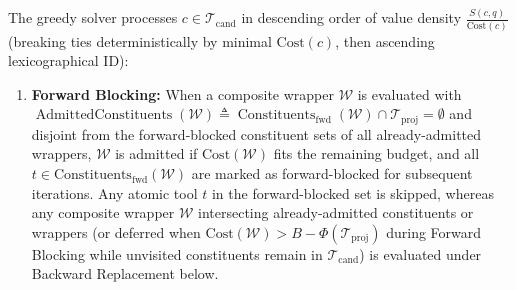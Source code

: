 \documentclass[conference,10pt]{IEEEtran}
\begin{document}
The greedy solver processes $c \in \mathcal{T}_{\text{cand}}$ in descending order of value density $\frac{S(c, q)}{\text{Cost}(c)}$ (breaking ties deterministically by minimal $\text{Cost}(c)$, then ascending lexicographical ID):
\begin{enumerate}
    \item \textbf{Forward Blocking:} When a composite wrapper $\mathcal{W}$ is evaluated with $\operatorname{AdmittedConstituents}(\mathcal{W}) \triangleq \operatorname{Constituents}_{\text{fwd}}(\mathcal{W}) \cap \mathcal{T}_{\text{proj}} = \emptyset$ and disjoint from the forward-blocked constituent sets of all already-admitted wrappers, $\mathcal{W}$ is admitted if $\text{Cost}(\mathcal{W})$ fits the remaining budget, and all $t \in \text{Constituents}_{\text{fwd}}(\mathcal{W})$ are marked as forward-blocked for subsequent iterations. Any atomic tool $t$ in the forward-blocked set is skipped, whereas any composite wrapper $\mathcal{W}$ intersecting already-admitted constituents or wrappers (or deferred when $\text{Cost}(\mathcal{W}) > B - \Phi(\mathcal{T}_{\text{proj}})$ during Forward Blocking while unvisited constituents remain in $\mathcal{T}_{\text{cand}}$) is evaluated under Backward Replacement below.

\end{enumerate}
\end{document}
